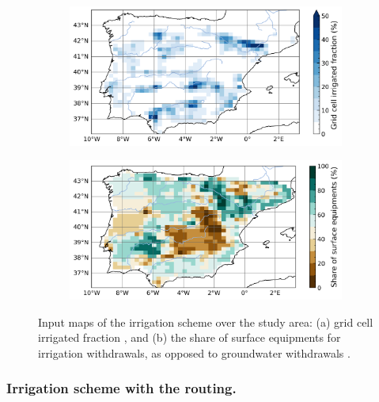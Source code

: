 \begin{figure}[htbp]
    \centering
    \begin{subfigure}[b]{0.48\textwidth}
        \caption{}
        \includegraphics[width=\textwidth]{images/methods/irrigated_fraction_map.png}
    \end{subfigure}
    \begin{subfigure}[b]{0.48\textwidth}
        \caption{}
        \includegraphics[width=\textwidth]{images/methods/aei_sw_map.png}
    \end{subfigure}
    \caption{Input maps of the irrigation scheme over the study area: (a) grid cell irrigated fraction \citep[\%, derived from][]{hurtt_harmonization_2020}, and (b) the share of surface equipments for irrigation withdrawals, as opposed to groundwater withdrawals \citep[\%, derived from][]{siebert_groundwater_2010}.}
    \label{fig:irrig_inputs}
\end{figure}

\subsubsection{Irrigation scheme with the \native routing.}
\label{sec:irrig_interp_variables}

